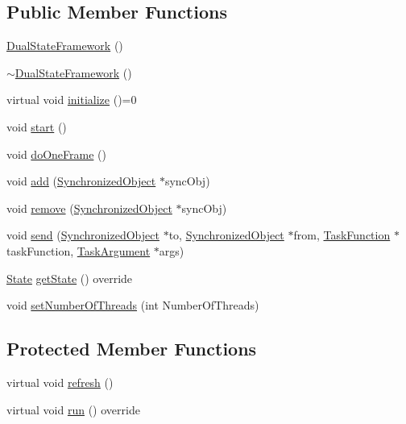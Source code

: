 \subsection*{Public Member Functions}
\begin{DoxyCompactItemize}
\item 
\hyperlink{classdsf_1_1_dual_state_framework_ab2c3f064dee1876d92694544d032b942}{Dual\+State\+Framework} ()
\item 
\hyperlink{classdsf_1_1_dual_state_framework_a0e5246056c73a684d0a167f3ed6d1fb1}{$\sim$\+Dual\+State\+Framework} ()
\item 
virtual void \hyperlink{classdsf_1_1_dual_state_framework_a809a7bba4148e17ea9a43a0a035383ba}{initialize} ()=0
\item 
void \hyperlink{classdsf_1_1_dual_state_framework_ab17692c652ab856818d5e8f0dd82f194}{start} ()
\item 
void \hyperlink{classdsf_1_1_dual_state_framework_a72f0e6753a30394c0e505bb0bc481e3f}{do\+One\+Frame} ()
\item 
void \hyperlink{classdsf_1_1_dual_state_framework_a2ce40c8e165a8ed8fd6cb6cb30ae985b}{add} (\hyperlink{classdsf_1_1_synchronized_object}{Synchronized\+Object} $\ast$sync\+Obj)
\item 
void \hyperlink{classdsf_1_1_dual_state_framework_ab6ca84c5186f4fc3e048c4ff7a104ae7}{remove} (\hyperlink{classdsf_1_1_synchronized_object}{Synchronized\+Object} $\ast$sync\+Obj)
\item 
void \hyperlink{classdsf_1_1_dual_state_framework_a3063d7f0ce537eb44dc2bdcec816a36b}{send} (\hyperlink{classdsf_1_1_synchronized_object}{Synchronized\+Object} $\ast$to, \hyperlink{classdsf_1_1_synchronized_object}{Synchronized\+Object} $\ast$from, \hyperlink{namespacedsf_aa16e735f29587f4485b56fc46746f7a9}{Task\+Function} $\ast$task\+Function, \hyperlink{namespacedsf_abe4bf68433935a81c31a5ada9b17663a}{Task\+Argument} $\ast$args)
\item 
\hyperlink{classdsf_1_1_runnable_a8eb63b21a0accc7a6a2a05f18e257991}{State} \hyperlink{classdsf_1_1_dual_state_framework_a9f41adffe986e0d9360e0bbfba2a245a}{get\+State} () override
\item 
void \hyperlink{classdsf_1_1_dual_state_framework_a8ab358a7456eeed264d53304b6562be4}{set\+Number\+Of\+Threads} (int Number\+Of\+Threads)
\end{DoxyCompactItemize}
\subsection*{Protected Member Functions}
\begin{DoxyCompactItemize}
\item 
virtual void \hyperlink{classdsf_1_1_dual_state_framework_ab4c6856bd4036f8abbc2be2c0f00ea1a}{refresh} ()
\item 
virtual void \hyperlink{classdsf_1_1_dual_state_framework_a7b40bcf755127022f9258e846ddedb23}{run} () override
\end{DoxyCompactItemize}
